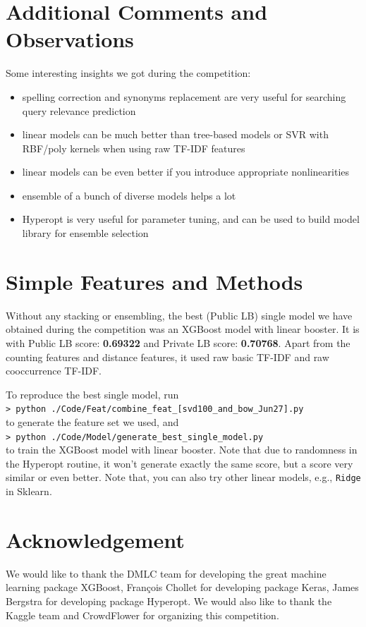 \documentclass[12pt]{article}
\begin{document}
\section{Additional Comments and Observations}
Some interesting insights we got during the competition:
\begin{itemize}
\item spelling correction and synonyms replacement are very useful for searching query relevance prediction
\item linear models can be much better than tree-based models or SVR with RBF/poly kernels when using raw TF-IDF features
\item linear models can be even better if you introduce appropriate nonlinearities
\item ensemble of a bunch of diverse models helps a lot
\item Hyperopt is very useful for parameter tuning, and can be used to build model library for ensemble selection
\end{itemize}

\section{Simple Features and Methods}
Without any stacking or ensembling, the best (Public LB) single model we have obtained during the competition was an XGBoost model with linear booster. It is with Public LB score: \textbf{0.69322} and Private LB score: \textbf{0.70768}. Apart from the counting features and distance features, it used raw basic TF-IDF and raw cooccurrence TF-IDF.

To reproduce the best single model, run\\
\texttt{> python ./Code/Feat/combine\_feat\_[svd100\_and\_bow\_Jun27].py}\\
to generate the feature set we used, and\\
\texttt{> python ./Code/Model/generate\_best\_single\_model.py}\\
to train the XGBoost model with linear booster. Note that due to randomness in the Hyperopt routine, it won't generate exactly the same score, but a score very similar or even better. Note that, you can also try other linear models, e.g., \texttt{Ridge} in Sklearn.

\section{Acknowledgement}
We would like to thank the DMLC team for developing the great machine learning package XGBoost, Fran\c{c}ois Chollet for developing package Keras, James Bergstra for developing package Hyperopt. We would also like to thank the Kaggle team and CrowdFlower for organizing this competition.



\end{document}

